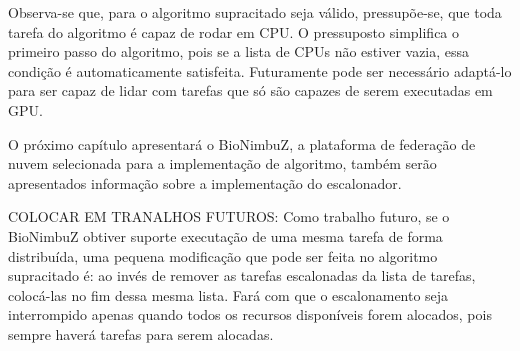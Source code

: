 Observa-se que, para o algoritmo supracitado seja válido, pressupõe-se, que toda tarefa do algoritmo é capaz de rodar em \acrshort{CPU}. O pressuposto simplifica o primeiro passo do algoritmo, pois se a lista de \acrshort{CPU}s não estiver vazia, essa condição é automaticamente satisfeita. Futuramente pode ser necessário adaptá-lo para ser capaz de lidar com tarefas que só são capazes de serem executadas em \acrshort{GPU}.

O próximo capítulo apresentará o BioNimbuZ, a plataforma de federação de nuvem selecionada para a implementação de algoritmo, também serão apresentados informação sobre a implementação do escalonador.

COLOCAR EM TRANALHOS FUTUROS: Como trabalho futuro, se o BioNimbuZ obtiver suporte executação de uma mesma tarefa de forma distribuída, uma pequena modificação que pode ser feita no algoritmo supracitado é: ao invés de remover as tarefas escalonadas da lista de tarefas, colocá-las no fim dessa mesma lista. Fará com que o escalonamento seja interrompido apenas quando todos os recursos disponíveis forem alocados, pois sempre haverá tarefas para serem alocadas.

